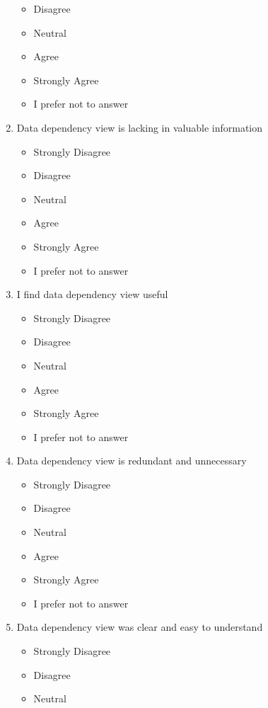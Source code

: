 \begin{enumerate}
\begin{itemize}
        \item Disagree
        \item Neutral
        \item Agree
        \item Strongly Agree
        \item I prefer not to answer
    \end{itemize}
    \item Data dependency view is lacking in valuable information
    \begin{itemize}
        \item Strongly Disagree
        \item Disagree
        \item Neutral
        \item Agree
        \item Strongly Agree
        \item I prefer not to answer
    \end{itemize}
    \item I find data dependency view useful
    \begin{itemize}
        \item Strongly Disagree
        \item Disagree
        \item Neutral
        \item Agree
        \item Strongly Agree
        \item I prefer not to answer
    \end{itemize}
    \item Data dependency view is redundant and unnecessary
    \begin{itemize}
        \item Strongly Disagree
        \item Disagree
        \item Neutral
        \item Agree
        \item Strongly Agree
        \item I prefer not to answer
    \end{itemize}
    \item Data dependency view was clear and easy to understand
    \begin{itemize}
        \item Strongly Disagree
        \item Disagree
        \item Neutral

\end{itemize}
\end{enumerate}
